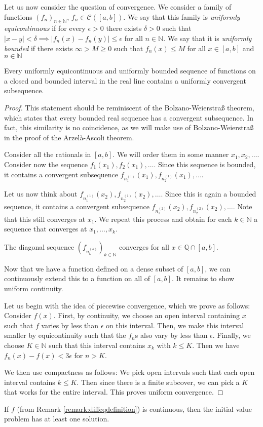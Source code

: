 \documentclass[prb,12pt]{revtex4-2}
\theoremstyle{definition}
\theoremstyle{definition}
\theoremstyle{definition}
\newcommand{\N}{\mathbb{N}}
\newcommand{\Q}{\mathbb{Q}}
\begin{document}
	Let us now consider the question of convergence. We consider a family of functions $(f_n)_{n\in \N}$, $f_n\in \mathcal{C}([a,b])$. We say that this family is \emph{uniformly equicontinuous} if for every $\epsilon>0$ there exists $\delta>0$ such that $|x-y|<\delta\implies |f_n(x)-f_n(y)|\le \epsilon$ for all $n\in \N$. We say that it is \emph{uniformly bounded} if there exists $\infty>M\ge 0$ such that $f_n(x)\le M$ for all $x\in [a,b]$ and $n\in \N$
	\begin{Theorem}
		Every uniformly equicontinuous and uniformly bounded sequence of functions on a closed and bounded interval in the real line contains a uniformly convergent subsequence.
	\end{Theorem}
	\begin{proof}
		This statement should be reminiscent of the Bolzano-Weierstraß theorem, which states that every bounded real sequence has a convergent subsequence. In fact, this similarity is no coincidence, as we will make use of Bolzano-Weierstraß in the proof of the Arzelà-Ascoli theorem.
		
		Consider all the rationals in $[a,b]$. We will order them in some manner $x_1, x_2, \dots$. Consider now the sequence $f_1(x_1), f_2(x_1), \dots$. Since this sequence is bounded, it contains a convergent subsequence $f_{n^{(1)}_1}(x_1), f_{n^{(1)}_2}(x_1), \dots$.
		
		Let us now think about $f_{n^{(1)}_1}(x_2), f_{n^{(1)}_2}(x_2), \dots$. Since this is again a bounded sequence, it contains a convergent subsequence $f_{n^{(2)}_1}(x_2), f_{n^{(2)}_2}(x_2), \dots$. Note that this still converges at $x_1$. We repeat this process and obtain for each $k\in \N$ a sequence that converges at $x_1, \dots, x_k$. 
		
		The diagonal sequence $(f_{n^{(k)}_k})_{k\in \N}$ converges for all $x\in \Q\cap [a,b]$.
		
		Now that we have a function defined on a dense subset of $[a,b]$, we can continuously extend this to a function on all of $[a,b]$. It remains to show uniform continuity.

		Let us begin with the idea of piecewise convergence, which we prove as follows: Consider $f(x)$.  First, by continuity, we choose an open interval containing $x$ such that $f$ varies by less than $\epsilon$ on this interval. Then, we make this interval smaller by equicontinuity such that the $f_n$s also vary by less than $\epsilon$. Finally, we choose $K\in \N$ such that this interval contains $x_k$ with $k\le K$. Then we have $f_n(x)-f(x)<3\epsilon$ for $n>K$.

		We then use compactness as follows: We pick open intervals such that each open interval contains $k\le K$. Then since there is a finite subcover, we can pick a $K$ that works for the entire interval. This proves uniform convergence.
	\end{proof}
	\begin{Theorem}[Peano]\label{thm:peano}
If $f$ (from Remark \ref{remark:diffeqdefinition}) is continuous, then the initial value problem has at least one solution.
	\end{Theorem}
\end{document}
